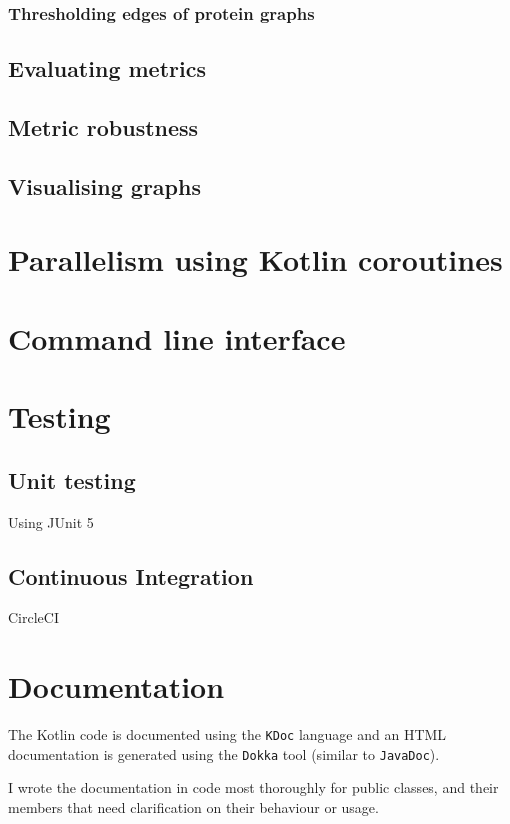 \subsubsection{Thresholding edges of protein graphs}

\subsection{Evaluating metrics}

\subsection{Metric robustness}

\subsection{Visualising graphs}


\section{Parallelism using Kotlin coroutines}


\section{Command line interface}\label{sec:cli}



\section{Testing}

\subsection{Unit testing}
Using JUnit 5

\subsection{Continuous Integration}
CircleCI


\section{Documentation}

The Kotlin code is documented using the \texttt{KDoc} language and an HTML documentation is generated using the \texttt{Dokka} tool (similar to \texttt{JavaDoc}).\citeneeded

I wrote the documentation in code most thoroughly for public classes, and their members that need clarification on their behaviour or usage.



